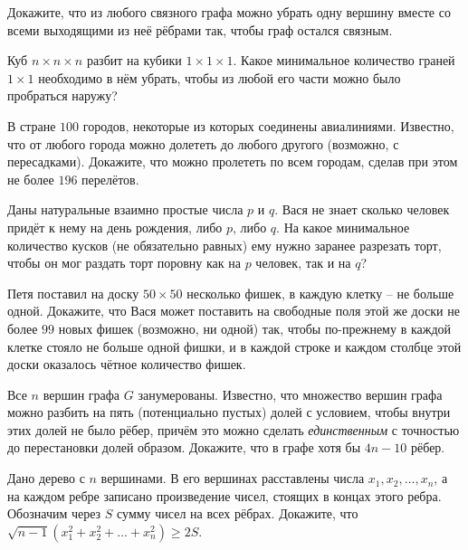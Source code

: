 \begin{problems}

\item Докажите, что из любого связного графа можно убрать одну вершину вместе со всеми выходящими из неё рёбрами так, чтобы граф остался связным.

\item Куб $n \times n \times n$ разбит на кубики $1 \times 1 \times 1$. Какое минимальное количество граней $1 \times 1$ необходимо в нём убрать, чтобы из любой его части можно было пробраться наружу?

\item В стране $100$ городов, некоторые из которых соединены авиалиниями. Известно, что от любого города можно долететь до любого другого (возможно, с пересадками). Докажите, что можно пролететь по всем городам, сделав при этом не более $196$ перелётов.

\item Даны натуральные взаимно простые числа $p$ и $q$. Вася не знает сколько человек придёт к нему на день рождения, либо $p$, либо $q$. На какое минимальное количество кусков (не обязательно равных) ему нужно заранее разрезать торт, чтобы он мог раздать торт поровну как на $p$ человек, так и на $q$?

\item Петя поставил на доску $50\times 50$ несколько фишек, в каждую клетку -- не больше одной. Докажите, что Вася может поставить на свободные поля этой же доски не более $99$ новых фишек (возможно, ни одной) так, чтобы по-прежнему в каждой клетке стояло не больше одной фишки, и в каждой строке и каждом столбце этой доски оказалось чётное количество фишек.

\item Все $n$ вершин графа $G$ занумерованы. Известно, что множество вершин графа можно разбить на пять (потенциально пустых) долей с условием, чтобы внутри этих долей не было рёбер, причём это можно сделать \textit{единственным} с точностью до перестановки долей образом. Докажите, что в графе хотя бы $4n - 10$ рёбер.

\item Дано дерево с $n$ вершинами. В его вершинах расставлены числа $x_1, x_2, \ldots, x_n$, а на каждом ребре записано произведение чисел, стоящих в концах этого ребра. Обозначим через $S$ сумму чисел на всех рёбрах. Докажите, что $\sqrt{n-1}(x_1^2 + x_2^2 + \ldots + x_n^2) \geqslant 2S$.

\end{problems}


